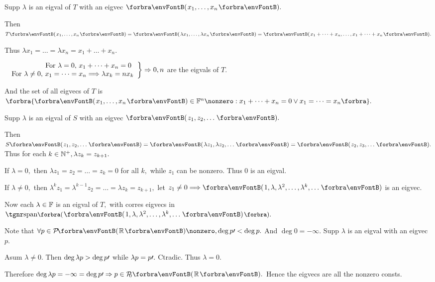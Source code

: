 \par\quad
Supp $\lambda$ is an eigval of $T$ with an eigvec $\Par{x_1,\dots,x_n}.$\par\quad
Then $T\Par{x_1,\dots,x_n}=\Par{\lambda x_1,\dots,\lambda x_n}=\Par{x_1+\dots+x_n,\dots,x_1+\dots+x_n}.$\par\quad
Thus $\lambda x_1=\dots=\lambda x_n=x_1+\dots+x_n.$\par\quad
$\hMath[0pt]{r}{\left.}{\right\}}{$
	For $\lambda=0,$ $x_1+\dots+x_n=0$ $\\$
	For $\lambda\neq 0,$ $x_1=\dots=x_n\Longrightarrow\lambda x_k=n x_k}\Rightarrow0,n$ are the eigvals of $T.$\par\quad
And the set of all eigvecs of $T$ is $\Bra{\Par{x_1,\dots,x_n}\in\Fbb^n\nonzero:x_1+\dots+x_n=0\vee x_1=\dots=x_n}.$\PfEnd
\SepLine

\par\quad
Supp $\lambda$ is an eigval of $S$ with an eigvec $\Par{z_1,z_2,\dots}.$\par\quad
Then $S\Par{z_1,z_2,\dots}=\Par{\lambda z_1,\lambda z_2,\dots}=\Par{z_2,z_3,\dots}.$ Thus for each $k\in{\mathbb{N}^+},\lambda z_k=z_{k+1}.$\par\quad
If $\lambda=0,$ then $\lambda z_1=z_2=\dots=z_k=0$ for all $k,$ while $z_1$ can be nonzero. Thus $0$ is an eigval.\par\quad
If $\lambda\neq 0,$ then $\lambda^k z_1=\lambda^{k-1} z_2=\dots=\lambda z_k=z_{k+1},$ let $z_1\neq 0\Longrightarrow\Par{1,\lambda,\lambda^2,\dots,\lambda^k,\dots}$ is an eigvec.\par\quad
Now each $\lambda\in{\mathbb{F}}$ is an eigval of $T,$ with corres eigvecs in $\Span[\BigPar]{\Par{1,\lambda,\lambda^2,\dots,\lambda^k,\dots}}.$\PfEnd
\SepLine\pagebreak

\par\quad
Note that $\forall p\in\PoRi\nonzero,\deg p\apostrophe<\deg p.$ And $\deg 0=-\infty.$ Supp $\lambda$ is an eigval with an eigvec $p.$\par\quad
Asum $\lambda\neq 0.$ Then $\deg\lambda p>\deg p\prime$ while $\lambda p=p\prime.$ Ctradic. Thus $\lambda=0.$\par\quad
Therefore $\deg \lambda p=-\infty=\deg p\apostrophe\Rightarrow p\in\PoR{0}.$ Hence the eigvecs are all the nonzero consts.\PfEnd
\SepLine

